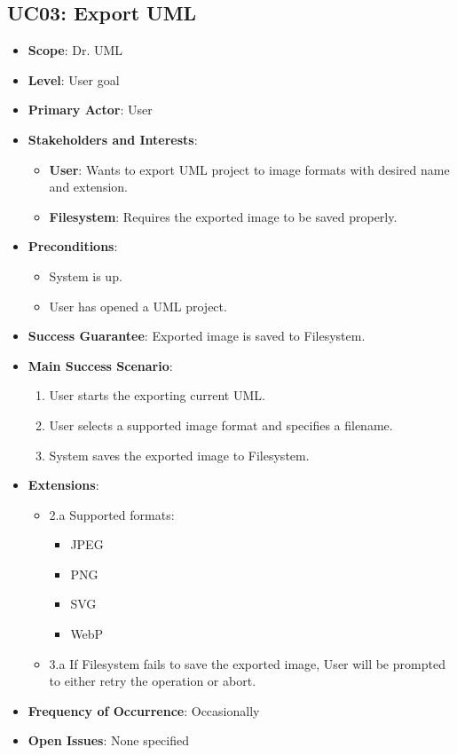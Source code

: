 \documentclass[12pt]{article}
\begin{document}
\subsection{UC03: Export UML}
\begin{itemize}
    \item \textbf{Scope}: Dr. UML
    \item \textbf{Level}: User goal
    \item \textbf{Primary Actor}: User
    \item \textbf{Stakeholders and Interests}:
    \begin{itemize}
        \item \textbf{User}: Wants to export UML project to image formats with desired name and extension.
        \item \textbf{Filesystem}: Requires the exported image to be saved properly.
    \end{itemize}
    \item \textbf{Preconditions}:
    \begin{itemize}
        \item System is up.
        \item User has opened a UML project.
    \end{itemize}
    \item \textbf{Success Guarantee}: Exported image is saved to Filesystem.
    \item \textbf{Main Success Scenario}:
    \begin{enumerate}
        \item User starts the exporting current UML.
        \item User selects a supported image format and specifies a filename.
        \item System saves the exported image to Filesystem.
    \end{enumerate}
    \item \textbf{Extensions}:
    \begin{itemize}
        \item 2.a Supported formats: 
        \begin{itemize}
            \item JPEG
            \item PNG
            \item SVG
            \item WebP
        \end{itemize}
        \item 3.a If Filesystem fails to save the exported image, User will be prompted to either retry the operation or abort.
    \end{itemize}
    \item \textbf{Frequency of Occurrence}: Occasionally
    \item \textbf{Open Issues}: None specified
\end{itemize}
\end{document}
